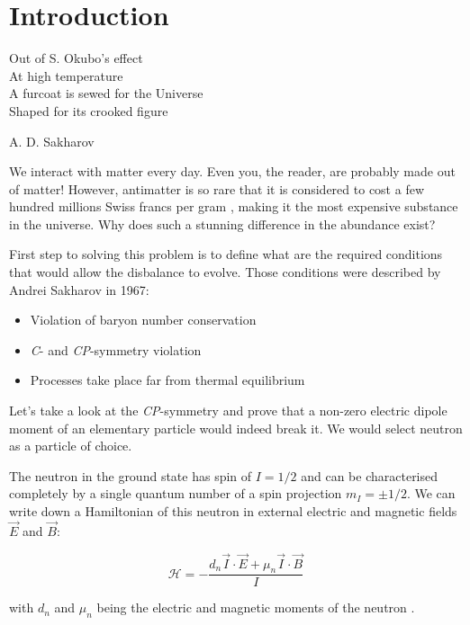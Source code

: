 \chapter{Introduction}
\label{chapter:introduction}

\setlength{\epigraphwidth}{0.43\textwidth}
\epigraph{
Out of S. Okubo's effect\\
At high temperature\\
A furcoat is sewed for the Universe\\
Shaped for its crooked figure
}{A. D. Sakharov \cite{Sakharov1991}}

We interact with matter every day. Even you, the reader, are probably made out of matter! However, antimatter is so rare that it is considered to cost a few hundred millions Swiss francs per gram \cite{DeRujula2001}, making it the most expensive substance in the universe. Why does such a stunning difference in the abundance exist?

First step to solving this problem is to define what are the required conditions that would allow the disbalance to evolve. Those conditions \cite{Dubbers2011} were described \cite{Sakharov1991} by Andrei Sakharov in 1967:

\begin{itemize}
	\item Violation of baryon number conservation
	\item \textit{C}- and \textit{CP}-symmetry violation
	\item Processes take place far from thermal equilibrium
\end{itemize}

Let's take a look at the \textit{CP}-symmetry and prove that a non-zero electric dipole moment of an elementary particle would indeed break it. We would select neutron as a particle of choice.

The neutron in the ground state has spin of $I = 1/2$ and can be characterised completely by a single quantum number of a spin projection $m_I = \pm 1/2$. We can write down a Hamiltonian \cite{Golub1994} of this neutron in external electric and magnetic fields $\vec{E}$ and $\vec{B}$:

\begin{equation}
	\mathcal{H} = -\frac{d_n \vec{I} \cdot \vec{E} + \mu_n \vec{I} \cdot \vec{B}}{I}
	\label{eq:neutron_hamiltonian}
\end{equation}

with $d_n$ and $\mu_n$ being the electric and magnetic moments of the neutron \cite{Golub1972}.

